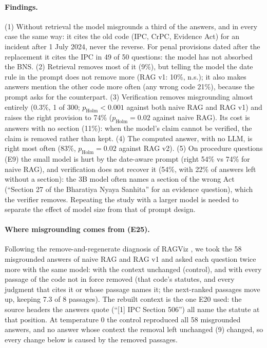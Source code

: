 \documentclass[sigconf,nonacm]{acmart}
\newcommand{\ph}{p_{\text{Holm}}}
\begin{document}
\paragraph{Findings.} (1) Without retrieval the model misgrounds a third of the answers, and in every
case the same way: it cites the old code (IPC, CrPC, Evidence Act) for an incident after 1 July
2024, never the reverse. For penal provisions dated after the replacement it cites the IPC in 49 of
50 questions: the model has not absorbed the BNS. (2) Retrieval removes most of it (9\%), but telling the model the date rule in
the prompt does not remove more (RAG v1: 10\%, n.s.); it also makes answers mention the other code
more often (any wrong code 21\%), because the prompt asks for the counterpart. (3) Verification
removes misgrounding almost entirely (0.3\%, 1 of 300; $\ph<0.001$ against both naive RAG and RAG v1)
and raises the right provision to 74\% ($\ph=0.02$ against naive RAG). Its cost is answers with no
section (11\%): when the model's claim cannot be verified, the claim is removed rather than kept.
(4) The computed answer, with no LLM, is right most often (83\%, $\ph=0.02$ against RAG v2). (5) On
procedure questions (E9) the small model is hurt by the date-aware prompt (right 54\% vs 74\% for naive
RAG), and verification does not recover it (54\%, with 22\% of answers left without a section): the
3B model often names a section of the wrong Act (``Section 27 of the Bharatiya Nyaya Sanhita'' for an
evidence question), which the verifier removes. Repeating the study with a larger model is needed to separate the effect of model size from
that of prompt design.

\paragraph{Where misgrounding comes from (E25).} Following the remove-and-regenerate diagnosis of
RAGViz \cite{ragviz}, we took the 58 misgrounded answers of naive RAG and RAG v1 and asked each
question twice more with the same model: with the context unchanged (control), and with every
passage of the code not in force removed (that code's statutes, and every judgment that cites it or
whose passage names it; the next-ranked passages move up, keeping 7.3 of 8 passages). The rebuilt
context is the one E20 used: the source headers the answers quote (``[1] IPC Section 506'') all
name the statute at that position. At temperature 0 the control reproduced all 58 misgrounded
answers, and no answer whose context the removal left unchanged (9) changed, so every change below
is caused by the removed passages.
\end{document}
